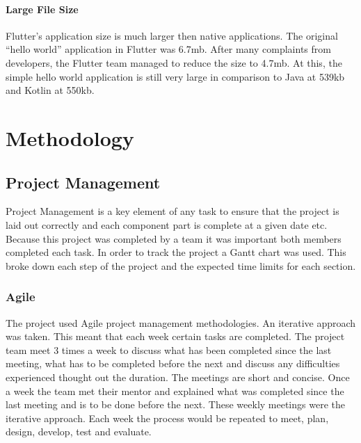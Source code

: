 \subsubsection{Large File Size}
Flutter’s application size is much larger then native applications. The original “hello world” application in Flutter was 6.7mb. After many complaints from developers, the Flutter team managed to reduce the size to 4.7mb. At this, the simple hello world application is still very large in comparison to Java at 539kb and Kotlin at 550kb.\cite{faq_2019} \cite{good_bad}



\chapter{Methodology}
\section{Project Management}

Project Management is a key element of any task to ensure that the project is laid out correctly and each component part is complete at a given date etc. Because this project was completed by a team it was important both members completed each task. In order to track the project a Gantt chart was used. This broke down each step of the project and the expected time limits for each section.

\subsection{Agile}

The project used Agile project management methodologies. An iterative approach was taken. This meant that each week certain tasks are completed. The project team meet 3 times a week to discuss what has been completed since the last meeting, what has to be completed before the next and discuss any difficulties experienced thought out the duration. The meetings are short and concise. Once a week the team met their mentor and explained what was completed since the last meeting and is to be done before the next. These weekly meetings were the iterative approach. Each week the process would be repeated to meet, plan, design, develop, test and evaluate.

